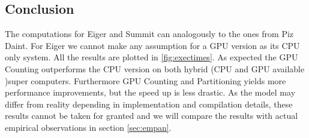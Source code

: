 \documentclass[]{article}
\begin{document}
\begin{comment}
This yields in a speed-up of:
\pgfmathsetmacro\speedup{\cpuSummit / \gpuSummitT}
\begin{center}
	\begin{equation}
		\frac{\cpuSummit s}{\gpuSummitT s} = \speedup \times
	\end{equation}
\end{center}


\vspace{5mm}


\subsection{Eiger}

\pgfmathsetmacro\cpuEiger{ln(1024) / ln(2) * (\p * \s / (204.8 * 2)}

\begin{center}
	\begin{equation}
		\log(1024) \times \p \times \frac{ \s GB }{204.8 GB/s \times 2} = \cpuEiger s
	\end{equation}
\end{center}

\end{comment}

\subsection{Conclusion}

 
The computations for Eiger and Summit can analogously to the ones from Piz Daint. For Eiger we cannot make any assumption for a GPU version as its CPU only system. All the results are plotted in \ref{fig:exectimes}. As expected the GPU Counting outperforms the CPU version on both hybrid (CPU and GPU available )super computers. Furthermore GPU Counting and Partitioning yields more performance improvements, but the speed up is less drastic. As the model may differ from reality depending in implementation and compilation details, these results cannot be taken for granted and we will compare the results with actual empirical observations in section \ref{sec:empan}. 
\end{document}
